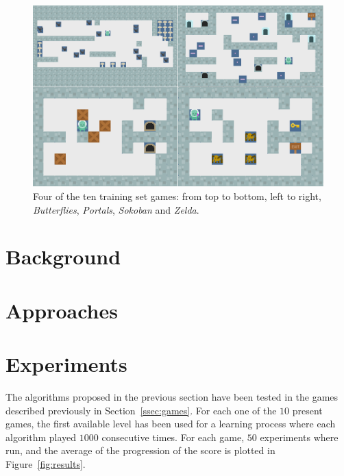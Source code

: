 \documentclass[conference]{IEEEtran}
\begin{document}
\begin{figure}[!t]
\begin{center}
\includegraphics[width=1.8\columnwidth]{img/games}
\end{center}
\caption{Four of the ten training set games: from top to bottom, left to right, \textit{Butterflies}, \textit{Portals}, \textit{Sokoban} and \textit{Zelda}.}
\label{fig:games}
\end{figure}




\section{Background} \label{sec:background}



\section{Approaches} \label{sec:approaches}



\section{Experiments} \label{sec:exp}

The algorithms proposed in the previous section have been tested in the games described previously in Section~\ref{ssec:games}. For each one of the $10$ present games, the first available level has been used for a learning process where each algorithm played $1000$ consecutive times. For each game, $50$ experiments where run, and the average of the progression of the score is plotted in Figure~\ref{fig:results}. 
\end{document}
